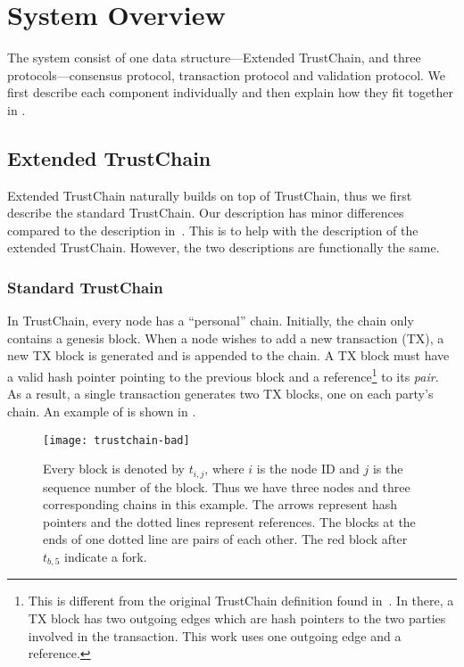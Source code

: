 \section{System Overview}
\label{sec:system-overview}
The system consist of one data structure---Extended TrustChain,
and three protocols---consensus protocol, transaction protocol and validation protocol.
We first describe each component individually and then explain how they fit together in .

\subsection{Extended TrustChain}
Extended TrustChain naturally builds on top of TrustChain, thus we first describe the standard TrustChain.
Our description has minor differences compared to the description in~\cite{trustchain}.
This is to help with the description of the extended TrustChain.
However, the two descriptions are functionally the same.

\subsubsection*{Standard TrustChain}
In TrustChain, every node has a ``personal'' chain. 
Initially, the chain only contains a genesis block.
When a node wishes to add a new transaction (TX), a new TX block is generated and is appended to the chain.
A TX block must have a valid hash pointer pointing to the previous block
and a reference\footnote{This is different from the original TrustChain definition found in~\cite{trustchain}.
In there, a TX block has two outgoing edges which are hash pointers to the two parties involved in the transaction.
This work uses one outgoing edge and a reference.} to its \emph{pair}.
As a result, a single transaction generates two TX blocks, one on each party's chain.
An example of is shown in .

\begin{figure}
    \texttt{[image: trustchain-bad]}
    \centering
    \caption{Every block is denoted by $t_{i,j}$, where $i$ is the node ID and $j$ is the sequence number of the block.
    Thus we have three nodes and three corresponding chains in this example.
    The arrows represent hash pointers and the dotted lines represent references.
    The blocks at the ends of one dotted line are pairs of each other.
    The red block after $t_{b, 5}$ indicate a fork.}
    \label{fig:trustchain-bad}
\end{figure}

